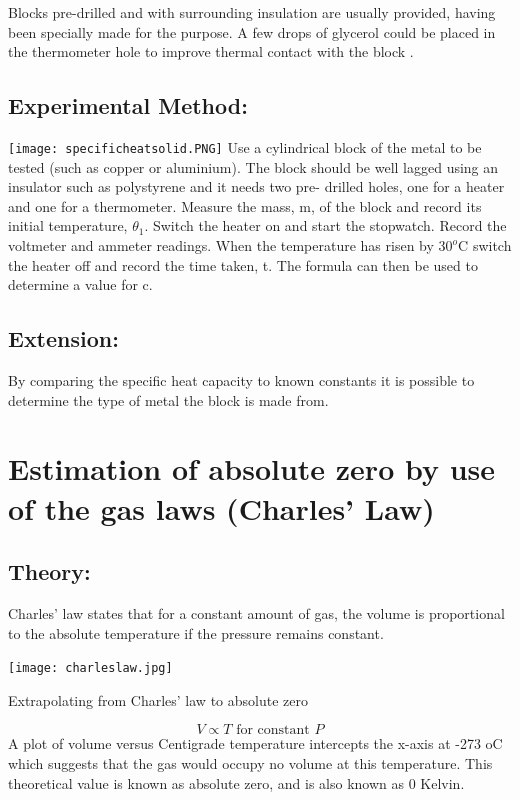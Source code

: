 Blocks pre-drilled and with surrounding insulation are usually provided, having been specially made for the purpose. A few drops of glycerol could be placed in the thermometer hole to improve thermal contact with the block .
\subsection{Experimental Method:}
\texttt{[image: specificheatsolid.PNG]}
Use a cylindrical block of the metal to be tested (such as copper or aluminium). The block should be well lagged using an insulator such as polystyrene  and it needs two pre- drilled holes, one for a heater and one for a thermometer. Measure the mass, m, of the block and record its initial temperature, \(\theta_1\). Switch the heater on and start the stopwatch. Record the voltmeter and ammeter readings. When the temperature has risen by \(30^{o}\)C switch the heater off and record the time taken, t. The formula can then be used to determine a value for c.
\subsection{Extension:}
By comparing the specific heat capacity to known constants it is possible to determine the type of metal the block is made from.

\section{Estimation of absolute zero by use of the gas laws (Charles' Law)}
\subsection{Theory:}
Charles' law states that for a constant amount of gas, the volume is proportional to the absolute temperature if the pressure remains constant. \begin{marginfigure}
\texttt{[image: charleslaw.jpg]}
\caption{Extrapolating from Charles' law to absolute zero}
\label{zero}
\end{marginfigure}
\[V \propto T\text{ for constant }P\]
A plot of volume versus Centigrade temperature intercepts the x-axis at -273 oC which suggests that the gas would occupy no volume at this temperature. This theoretical value is known as absolute zero, and is also known as 0 Kelvin.
